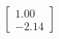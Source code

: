 \documentclass[preview]{standalone}
\begin{document}
\begin{align*}
\begin{bmatrix} 1.00 \\ -2.14 \end{bmatrix}
\end{align*}
\end{document}
